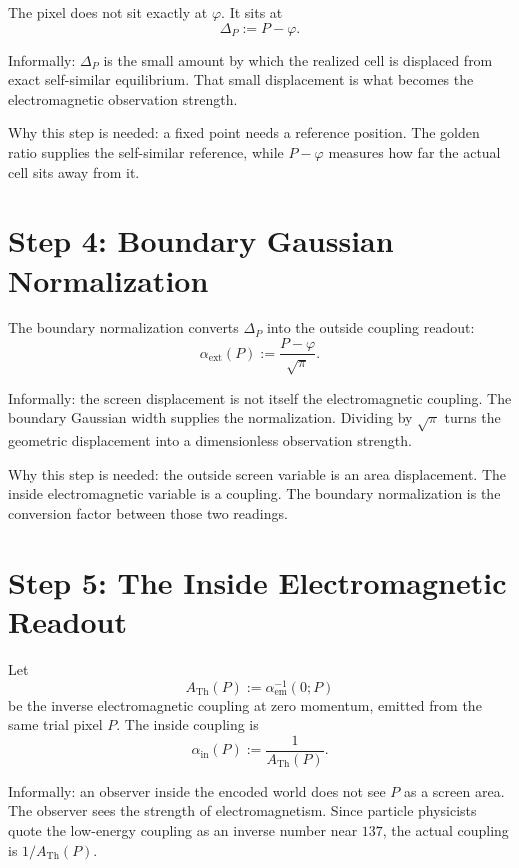 \documentclass[11pt]{article}
\theoremstyle{remark}
\newcommand{\ATh}{A_{\mathrm{Th}}}
\begin{document}
The pixel does not sit exactly at \(\varphi\). It sits at
\begin{equation}
\Delta_P:=P-\varphi.
\label{eq:deltaP}
\end{equation}

Informally: \(\Delta_P\) is the small amount by which the realized cell is displaced from exact self-similar equilibrium. That small displacement is what becomes the electromagnetic observation strength.

Why this step is needed: a fixed point needs a reference position. The golden ratio supplies the self-similar reference, while \(P-\varphi\) measures how far the actual cell sits away from it.

\section{Step 4: Boundary Gaussian Normalization}

The boundary normalization converts \(\Delta_P\) into the outside coupling readout:
\begin{equation}
\alpha_{\mathrm{ext}}(P):=\frac{P-\varphi}{\sqrt\pi}.
\label{eq:alphaext}
\end{equation}

Informally: the screen displacement is not itself the electromagnetic coupling. The boundary Gaussian width supplies the normalization. Dividing by \(\sqrt\pi\) turns the geometric displacement into a dimensionless observation strength.

Why this step is needed: the outside screen variable is an area displacement. The inside electromagnetic variable is a coupling. The boundary normalization is the conversion factor between those two readings.

\section{Step 5: The Inside Electromagnetic Readout}

Let
\begin{equation}
\ATh(P):=\alpha_{\mathrm{em}}^{-1}(0;P)
\label{eq:ATdef}
\end{equation}
be the inverse electromagnetic coupling at zero momentum, emitted from the same trial pixel \(P\). The inside coupling is
\begin{equation}
\alpha_{\mathrm{in}}(P):=\frac{1}{\ATh(P)}.
\label{eq:alphain}
\end{equation}

Informally: an observer inside the encoded world does not see \(P\) as a screen area. The observer sees the strength of electromagnetism. Since particle physicists quote the low-energy coupling as an inverse number near \(137\), the actual coupling is \(1/\ATh(P)\).
\end{document}
